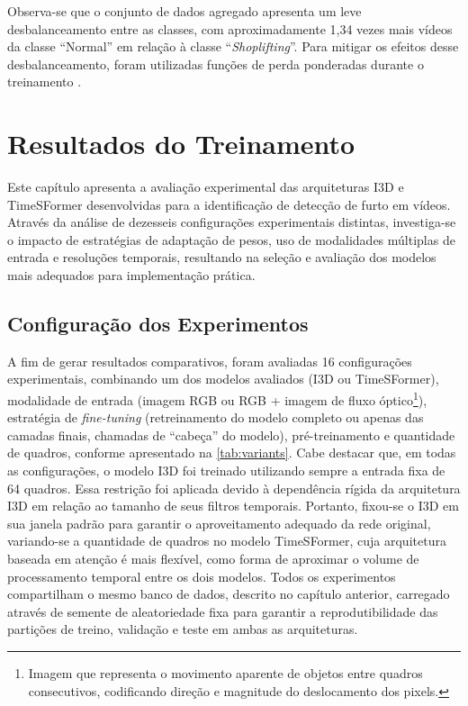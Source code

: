 \documentclass[12pt, %
openright, 
oneside, %
a4paper,    %
brazil]{facom-ufu-abntex2}
\begin{document}
Observa-se que o conjunto de dados agregado apresenta um leve desbalanceamento entre as classes, com aproximadamente 1,34 vezes mais vídeos da classe “Normal” em relação à classe “\textit{Shoplifting}”. Para mitigar os efeitos desse desbalanceamento, foram utilizadas funções de perda ponderadas durante o treinamento \cite{imbalanced}.


\chapter[Resultados do Treinamento]{Resultados do Treinamento}

Este capítulo apresenta a avaliação experimental das arquiteturas I3D e TimeSFormer desenvolvidas para a identificação de detecção de furto em vídeos. Através da análise de dezesseis configurações experimentais distintas, investiga-se o impacto de estratégias de adaptação de pesos, uso de modalidades múltiplas de entrada e resoluções temporais, resultando na seleção e avaliação dos modelos mais adequados para implementação prática.

\section[Configuração dos Experimentos]{Configuração dos Experimentos}

A fim de gerar resultados comparativos, foram avaliadas 16 configurações experimentais, combinando um dos modelos avaliados (I3D ou TimeSFormer), modalidade de entrada (imagem RGB ou RGB + imagem de fluxo óptico\footnote{Imagem que representa o movimento aparente de objetos entre quadros consecutivos, codificando direção e magnitude do deslocamento dos pixels.}), estratégia de \textit{fine-tuning}  (retreinamento do modelo completo ou apenas das camadas finais, chamadas de “cabeça” do modelo), pré-treinamento e quantidade de quadros, conforme apresentado na \autoref{tab:variants}. Cabe destacar que, em todas as configurações, o modelo I3D foi treinado utilizando sempre a entrada fixa de 64 quadros. Essa restrição foi aplicada devido à dependência rígida da arquitetura I3D em relação ao tamanho de seus filtros temporais. Portanto, fixou-se o I3D em sua janela padrão para garantir o aproveitamento adequado da rede original, variando-se a quantidade de quadros no modelo TimeSFormer, cuja arquitetura baseada em atenção é mais flexível, como forma de aproximar o volume de processamento temporal entre os dois modelos. Todos os experimentos compartilham o mesmo banco de dados, descrito no capítulo anterior, carregado através de semente de aleatoriedade fixa para garantir a reprodutibilidade das partições de treino, validação e teste em ambas as arquiteturas.
\end{document}
